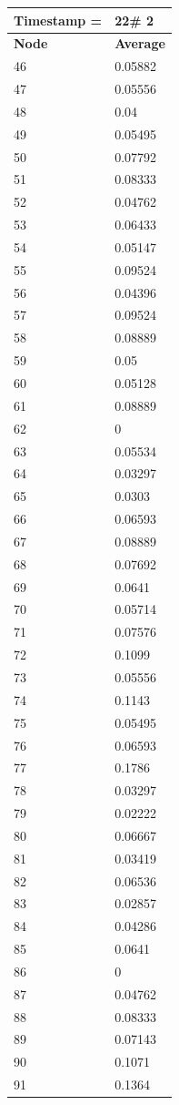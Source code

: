 \begin{tabular}{|l||l|}
\hline
\textbf{Timestamp =} & \textbf{22}\# 2\\\hline
	\textbf{Node} & \textbf{Average} \\ \hline
\hline
	46 & 0.05882 \\ \hline
	47 & 0.05556 \\ \hline
	48 & 0.04 \\ \hline
	49 & 0.05495 \\ \hline
	50 & 0.07792 \\ \hline
	51 & 0.08333 \\ \hline
	52 & 0.04762 \\ \hline
	53 & 0.06433 \\ \hline
	54 & 0.05147 \\ \hline
	55 & 0.09524 \\ \hline
	56 & 0.04396 \\ \hline
	57 & 0.09524 \\ \hline
	58 & 0.08889 \\ \hline
	59 & 0.05 \\ \hline
	60 & 0.05128 \\ \hline
	61 & 0.08889 \\ \hline
	62 & 0 \\ \hline
	63 & 0.05534 \\ \hline
	64 & 0.03297 \\ \hline
	65 & 0.0303 \\ \hline
	66 & 0.06593 \\ \hline
	67 & 0.08889 \\ \hline
	68 & 0.07692 \\ \hline
	69 & 0.0641 \\ \hline
	70 & 0.05714 \\ \hline
	71 & 0.07576 \\ \hline
	72 & 0.1099 \\ \hline
	73 & 0.05556 \\ \hline
	74 & 0.1143 \\ \hline
	75 & 0.05495 \\ \hline
	76 & 0.06593 \\ \hline
	77 & 0.1786 \\ \hline
	78 & 0.03297 \\ \hline
	79 & 0.02222 \\ \hline
	80 & 0.06667 \\ \hline
	81 & 0.03419 \\ \hline
	82 & 0.06536 \\ \hline
	83 & 0.02857 \\ \hline
	84 & 0.04286 \\ \hline
	85 & 0.0641 \\ \hline
	86 & 0 \\ \hline
	87 & 0.04762 \\ \hline
	88 & 0.08333 \\ \hline
	89 & 0.07143 \\ \hline
	90 & 0.1071 \\ \hline
	91 & 0.1364 \\ \hline
\end{tabular}
